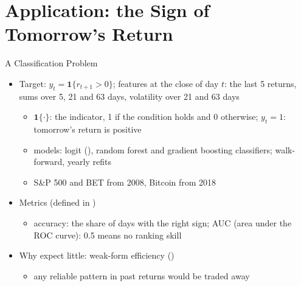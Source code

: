\section{Application: the Sign of Tomorrow's Return}

\begin{frame}{A Classification Problem}
\itemsize{\small}
\begin{itemize}
    \item Target: $y_t = \mathbf{1}\{r_{t+1} > 0\}$; features at the close of day $t$: the last 5 returns, sums over 5, 21 and 63 days, volatility over 21 and 63 days
    \begin{itemize}
        \item $\mathbf{1}\{\cdot\}$: the indicator, 1 if the condition holds and 0 otherwise; $y_t = 1$: tomorrow's return is positive
        \item models: logit (), random forest and gradient boosting classifiers; walk-forward, yearly refits
        \item S\&P 500 and BET from 2008, Bitcoin from 2018
    \end{itemize}
    \item Metrics (defined in )
    \begin{itemize}
        \item accuracy: the share of days with the right sign; AUC (area under the ROC curve): 0.5 means no ranking skill
    \end{itemize}
    \item Why expect little: weak-form efficiency ()
    \begin{itemize}
        \item any reliable pattern in past returns would be traded away
    \end{itemize}
\end{itemize}
\end{frame}

